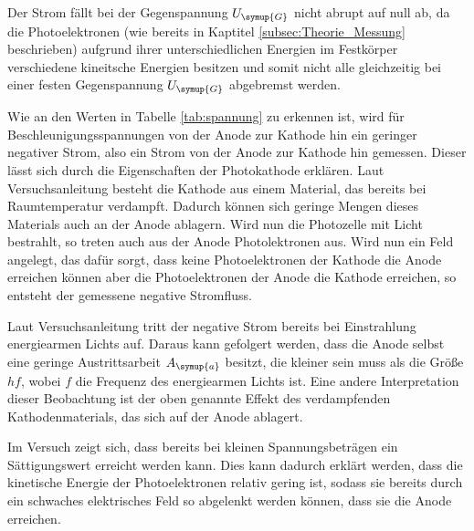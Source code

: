 Der Strom fällt bei der Gegenspannung $U_{\symup{G}}$ nicht abrupt auf null ab,
da die Photoelektronen (wie bereits in Kaptitel \ref{subsec:Theorie_Messung}
beschrieben) aufgrund ihrer unterschiedlichen Energien im Festkörper
verschiedene kineitsche Energien besitzen und somit nicht alle gleichzeitig
bei einer festen Gegenspannung $U_{\symup{G}}$ abgebremst werden.

Wie an den Werten in Tabelle \ref{tab:spannung} zu erkennen ist, wird für Beschleunigungsspannungen
von der Anode zur Kathode hin ein geringer negativer Strom, also ein Strom von
der Anode zur Kathode hin gemessen. Dieser lässt sich durch die Eigenschaften der
Photokathode erklären. Laut Versuchsanleitung \cite{Versuchsanleitung} besteht die
Kathode aus einem Material, das bereits bei Raumtemperatur verdampft. Dadurch können
sich geringe Mengen dieses Materials auch an der Anode ablagern. Wird nun die
Photozelle mit Licht bestrahlt, so treten auch aus der Anode Photolektronen aus.
Wird nun ein Feld angelegt, das dafür sorgt, dass keine Photoelektronen der Kathode
die Anode erreichen können aber die Photoelektronen der Anode die Kathode erreichen,
so entsteht der gemessene negative Stromfluss.

Laut Versuchsanleitung \cite{Versuchsanleitung} tritt der negative Strom bereits
bei Einstrahlung energiearmen Lichts auf. Daraus kann gefolgert werden, dass die
Anode selbst eine geringe Austrittsarbeit $A_{\symup{a}}$ besitzt, die kleiner sein muss
als die Größe $hf$, wobei $f$ die Frequenz des energiearmen Lichts ist.
Eine andere Interpretation dieser Beobachtung ist der oben genannte Effekt des
verdampfenden Kathodenmaterials, das sich auf der Anode ablagert.

Im Versuch zeigt sich, dass bereits bei kleinen Spannungsbeträgen ein Sättigungswert
erreicht werden kann. Dies kann dadurch erklärt werden, dass die kinetische Energie
der Photoelektronen relativ gering ist, sodass sie bereits durch ein schwaches
elektrisches Feld so abgelenkt werden können, dass sie die Anode erreichen.
